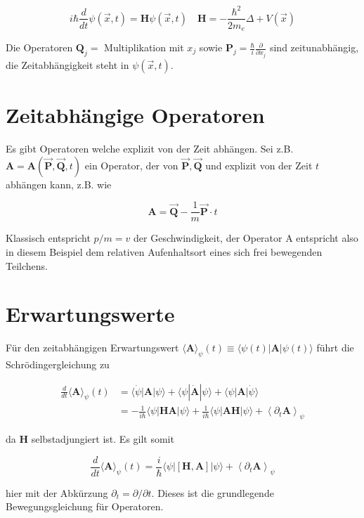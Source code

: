 \documentclass[10pt, letterpaper]{article}
\begin{document}
$$
i \hbar \frac{d}{d t} \psi(\vec{x}, t)=\mathbf{H} \psi(\vec{x}, t) \quad \mathbf{H}=-\frac{\hbar^{2}}{2 m_{e}} \Delta+V(\vec{x})
$$

Die Operatoren $\mathbf{Q}_{j}=$ Multiplikation mit $x_{j}$ sowie $\mathbf{P}_{j}=\frac{\hbar}{i} \frac{\partial}{\partial x_{j}}$ sind zeitunabhängig, die Zeitabhängigkeit steht in $\psi(\vec{x}, t)$.

\section*{Zeitabhängige Operatoren}
Es gibt Operatoren welche explizit von der Zeit abhängen. Sei z.B. $\mathbf{A}=\mathbf{A}(\overrightarrow{\mathbf{P}}, \overrightarrow{\mathbf{Q}}, t)$ ein Operator, der von $\overrightarrow{\mathbf{P}}, \overrightarrow{\mathbf{Q}}$ und explizit von der Zeit $t$ abhängen kann, z.B. wie

$$
\mathbf{A}=\overrightarrow{\mathbf{Q}}-\frac{1}{m} \overrightarrow{\mathbf{P}} \cdot t
$$

Klassisch entspricht $p / m=v$ der Geschwindigkeit, der Operator A entspricht also in diesem Beispiel dem relativen Aufenhaltsort eines sich frei bewegenden Teilchens.

\section*{Erwartungswerte}
Für den zeitabhängigen Erwartungswert $\langle\mathbf{A}\rangle_{\psi}(t) \equiv\langle\psi(t)| \mathbf{A}|\psi(t)\rangle$ führt die Schrödingergleichung zu

$$
\begin{aligned}
\frac{d}{d t}\langle\mathbf{A}\rangle_{\psi}(t) & =\langle\dot{\psi}| \mathbf{A}|\psi\rangle+\langle\psi| \dot{\mathbf{A}}|\psi\rangle+\langle\psi| \mathbf{A}|\dot{\psi}\rangle \\
& =-\frac{1}{i \hbar}\langle\psi| \mathbf{H A}|\psi\rangle+\frac{1}{i \hbar}\langle\psi| \mathbf{A H}|\psi\rangle+\left\langle\partial_{t} \mathbf{A}\right\rangle_{\psi}
\end{aligned}
$$

da $\mathbf{H}$ selbstadjungiert ist. Es gilt somit

$$
\frac{d}{d t}\langle\mathbf{A}\rangle_{\psi}(t)=\frac{i}{\hbar}\langle\psi|[\mathbf{H}, \mathbf{A}]|\psi\rangle+\left\langle\partial_{t} \mathbf{A}\right\rangle_{\psi}
$$

hier mit der Abkürzung $\partial_{t}=\partial / \partial t$. Dieses ist die grundlegende Bewegungsgleichung für Operatoren.
\end{document}
